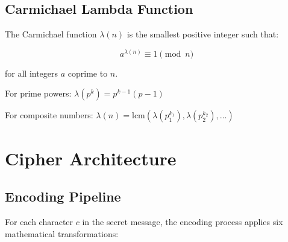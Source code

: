 \documentclass[11pt,a4paper]{article}
\begin{document}
\subsection{Carmichael Lambda Function}

The Carmichael function $\lambda(n)$ is the smallest positive integer such that:

\begin{equation}
a^{\lambda(n)} \equiv 1 \pmod{n}
\end{equation}

for all integers $a$ coprime to $n$.

For prime powers: $\lambda(p^k) = p^{k-1}(p-1)$

For composite numbers: $\lambda(n) = \text{lcm}(\lambda(p_1^{k_1}), \lambda(p_2^{k_2}), \ldots)$

\section{Cipher Architecture}

\subsection{Encoding Pipeline}

For each character $c$ in the secret message, the encoding process applies six mathematical transformations:
\end{document}
